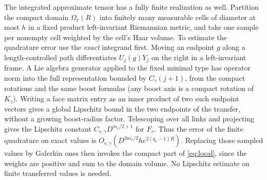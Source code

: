 \documentclass[11pt]{article}
\theoremstyle{remark}
\begin{document}
The integrated approximate tensor has a fully finite realization as well. Partition the compact domain \(\Omega_v(R)\) into finitely many measurable cells of diameter at most \(h\) in a fixed product left-invariant Riemannian metric, and take one sample per nonempty cell weighted by the cell's Haar volume. To estimate the quadrature error use the \emph{exact} integrand first. Moving an endpoint \(g\) along a length-controlled path differentiates \(U_j(g)Y_j\) on the right in a left-invariant frame. A Lie algebra generator applied to the fixed minimal type has operator norm into the full representation bounded by \(C_\gamma(j+1)\), from the compact rotations and the same boost formulas (any boost axis is a compact rotation of \(K_z\)). Writing a face matrix entry as an inner product of two such endpoint vectors gives a global Lipschitz bound in the two endpoints of the transfer, without a growing boost-radius factor. Telescoping over all links and projecting gives the Lipschitz constant \(C_{v,\gamma}D^{m_v/2+1}\) for \(F_v\). Thus the error of the finite quadrature on exact values is \(O_{v,\gamma}(D^{3m_v/2}he^{2(q_v-1)R})\). Replacing those sampled values by Galerkin ones then invokes the compact part of \eqref{eq:local}, since the weights are positive and sum to the domain volume. No Lipschitz estimate on finite transferred values is needed.
\end{document}
